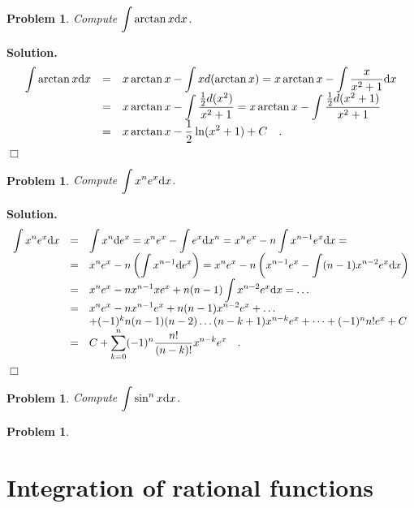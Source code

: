 \documentclass[12pt]{book}
\newenvironment{solution}{\medskip\noindent\textbf{Solution.} }{$\Box$}
\newtheorem{problem}[theorem]{Problem}
\begin{document}
\begin{problem}
Compute $\displaystyle\int \arctan x {\normalfont \text{d}} x$.
\end{problem}
\begin{solution}
\[
\begin{array}{rcl}
\displaystyle\int \arctan x {\normalfont \text{d}} x &=& x\displaystyle \arctan x - \int x d(\arctan x)= x\arctan x - \int \frac{x}{x^2+1}{\normalfont \text{d}} x\\
&=& \displaystyle  x\arctan x - \int \frac{\frac{1}2d(x^2)}{x^2+1}=  x\arctan x - \int \frac{\frac{1}2d(x^2+1)}{x^2+1}\\
&=&\displaystyle  x\arctan x - \frac12\ln (x^2+1) +C\quad .
\end{array}
\]
\end{solution}
\begin{problem}
Compute $\displaystyle \int x^n e^x {\normalfont \text{d}} x$.
\end{problem}
\begin{solution}
\[
\begin{array}{rcl}
\displaystyle\int x^n e^x {\normalfont \text{d}} x &=& \displaystyle\int x^n {\normalfont \text{d}} e^x= x^n e^x- \int  e^x {\normalfont \text{d}} x^n= x^n e^x- n\int  x^{n-1}e^x {\normalfont \text{d}} x=\\
&=&\displaystyle x^ne^x- n\left(\int x^{n-1}{\normalfont \text{d}} e^x \right)= x^ne^x - n\left(x^{n-1}e^x- \int (n-1)x^{n-2}e^x {\normalfont \text{d}} x\right)\\
&=&\displaystyle x^{n}e^x-nx^{n-1}xe^x+n(n-1)\int x^{n-2}e^x {\normalfont \text{d}} x =\dots\\
&=&\displaystyle x^ne^{x}- nx^{n-1}e^x + n(n-1 )x^{n-2 } e^x + \dots \\
&&+(-1)^kn(n-1)(n-2)\dots(n-k+1)x^{n-k}e^x+\dots +(-1)^n n! e^x+C\\
&=&\displaystyle C+\sum_{k=0}^{n} (-1)^n\frac{n!}{(n-k)!} x^{n-k} e^x \quad .
\end{array}
\]
\end{solution}
\begin{problem}
Compute $\displaystyle\int \sin^n x {\normalfont \text{d}} x$.

\end{problem}

\begin{problem}

\end{problem}


\section{Integration of rational functions}\label{secIntegrationRationalFunctions}
\end{document}
